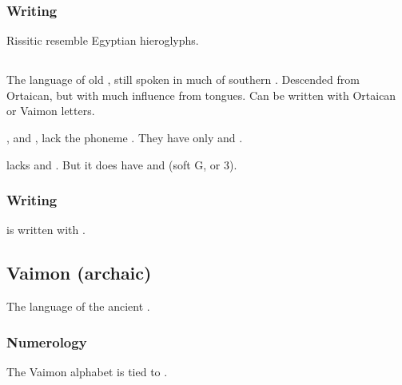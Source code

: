 \subsubsection{Writing}
Rissitic  resemble Egyptian hieroglyphs. 









\subsection{\Tepharin}
The language of old \Tephar, still spoken in much of southern \Velcad. 
Descended from Ortaican, but with much influence from \human{} tongues. 
Can be written with Ortaican or Vaimon letters. 

\Tepharin, and \Ortaican, lack the phoneme \txipa{[v]}. 
They have only \txipa{[w]} and \txipa{[hw]}. 

\Tepharin{} lacks \txipa{[z]} and \txipa{[S]}.
But it does have \txipa{[D]} and \txipa{[3]} (soft G, or 3). 










\subsubsection{Writing}
\Tepharin{} is written with . 









\subsection{Vaimon (archaic)}
The language of the ancient . 









\subsubsection{Numerology}
The Vaimon alphabet is tied to . 





